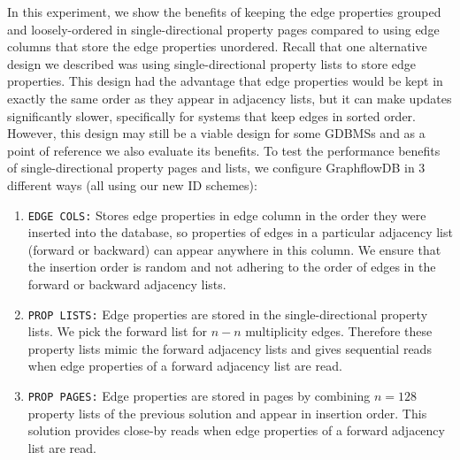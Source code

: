 In this experiment, we show the benefits of keeping the edge properties grouped and loosely-ordered in single-directional property pages compared to using edge columns that store the edge properties unordered. Recall that one alternative design we described was using single-directional property lists to store edge properties. This design had the advantage that edge properties would be kept in exactly the same order as they appear in adjacency lists, but it can make updates significantly slower, specifically for systems that keep edges in sorted order. However, this design may still be a viable design for some GDBMSs and as a point of reference we also evaluate its benefits. 
To test the performance benefits of single-directional property pages and lists, we configure GraphflowDB  in 3 different ways (all using our new ID schemes):

\begin{enumerate}
	\item \texttt{EDGE COLS:} Stores edge properties in edge column in the order they were inserted into the database, so properties of edges in a particular adjacency list (forward or backward) can appear anywhere in this column. We ensure that the insertion order is random and not adhering to the order of edges in the forward or backward adjacency lists. %
	\item \texttt{PROP LISTS:} Edge properties are stored in the single-directional property lists. We pick the forward list for $n-n$ multiplicity edges. Therefore these property lists mimic the forward adjacency lists and gives sequential reads when edge properties of a forward adjacency list are read.
	
	\item \texttt{PROP PAGES:} Edge properties are stored in pages by combining $n=128$ property lists of the previous solution and appear in insertion order. This solution provides close-by reads when edge properties of a forward adjacency list are read.
\end{enumerate}

